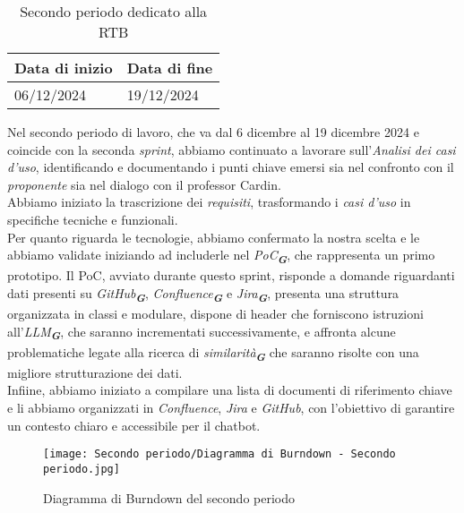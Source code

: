 \newpage
{}
\label{sec:secondo periodo}
\begin{table}[h!]
    \centering
    \renewcommand{\arraystretch}{1.5} %
    \begin{tabularx}{\textwidth}{|X|X|}\hline
    \rowcolor[HTML]{FFD700} 
    \textbf{Data di inizio} & \textbf{Data di fine} \\ \hline
    06/12/2024 & 19/12/2024 \\ \hline
    \end{tabularx}
    \caption{Secondo periodo dedicato alla RTB}
\end{table}
Nel secondo periodo di lavoro, che va dal 6 dicembre al 19 dicembre 2024 e coincide con la seconda \textit{sprint}, abbiamo continuato a lavorare sull’\emph{Analisi dei casi d’uso}, identificando e documentando i punti chiave emersi sia nel confronto con il \emph{proponente} sia nel dialogo con il professor Cardin.\\
Abbiamo iniziato la trascrizione dei \emph{requisiti}, trasformando i \emph{casi d’uso} in specifiche tecniche e funzionali.\\
Per quanto riguarda le tecnologie, abbiamo confermato la nostra scelta e le abbiamo validate iniziando ad includerle nel \emph{PoC}\textsubscript{\textit{\textbf{G}}}, che rappresenta un primo prototipo. Il PoC, avviato durante questo sprint, risponde a domande riguardanti dati presenti su \emph{GitHub}\textsubscript{\textit{\textbf{G}}},
\emph{Confluence}\textsubscript{\textit{\textbf{G}}} e \emph{Jira}\textsubscript{\textit{\textbf{G}}}, presenta una struttura organizzata in classi e modulare, dispone di header che forniscono istruzioni all'\emph{LLM}\textsubscript{\textit{\textbf{G}}}, che saranno incrementati successivamente, e affronta alcune problematiche legate alla
ricerca di \emph{similarità}\textsubscript{\textit{\textbf{G}}} che saranno risolte con una migliore strutturazione dei dati. \\
Infiine, abbiamo iniziato a compilare una lista di documenti di riferimento chiave e li abbiamo organizzati in \emph{Confluence}, \emph{Jira} e \emph{GitHub}, con l’obiettivo di garantire un contesto chiaro e accessibile per il chatbot.

\newpage
\begin{figure}[h] 
    \centering
    \texttt{[image: Secondo periodo/Diagramma di Burndown - Secondo periodo.jpg]}
    \caption{Diagramma di Burndown del secondo periodo} 
    \label{fig: Diagramma di Burndown del secondo periodo}
\end{figure}

